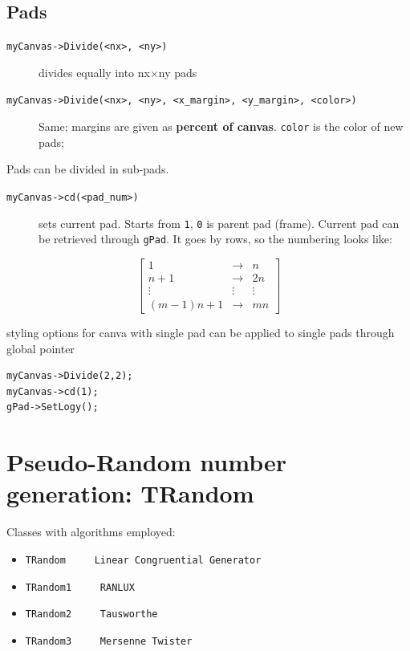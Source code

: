 \documentclass[10pt, twoside]{article}
\newcommand{\ttt}[1]{\colorbox{boxgray}{\texttt{#1}}}
\begin{document}
\subsection*{Pads}
\begin{description}
\item[\ttt{myCanvas->Divide(<nx>, <ny>)}] divides equally into nx$\times$ny pads 
\item[\ttt{myCanvas->Divide(<nx>, <ny>, <x\_margin>, <y\_margin>, <color>)}] Same; margins are given as \textbf{percent of canvas}. \ttt{color} is the color of new pads; 
\end{description}
Pads can be divided in sub-pads.
\begin{description}
\item[\ttt{myCanvas->cd(<pad\_num>)}] sets current pad. Starts from \ttt{1}, \ttt{0} is parent pad (frame). Current pad can be retrieved through \ttt{gPad}. It goes by rows, so the numbering looks like:
\end{description}
\[\begin{bmatrix}
1 & \rightarrow &  n \\
n+1 & \rightarrow & 2n \\
\vdots & \vdots & \vdots\\
(m-1)n + 1 & \rightarrow & mn
\end{bmatrix}\]

styling options for canva with single pad can be applied to single pads through global pointer
\begin{verbatim}
myCanvas->Divide(2,2);
myCanvas->cd(1);
gPad->SetLogy();
\end{verbatim}

\newpage
\section{Pseudo-Random number generation: TRandom}
Classes with algorithms employed:
\begin{itemize}
\item \texttt{TRandom \, \dotfill \, Linear Congruential Generator}
\begin{center}
\end{center}
\item \texttt{TRandom1 \, \dotfill \, RANLUX}
\item \texttt{TRandom2 \, \dotfill \, Tausworthe}
\item \texttt{TRandom3 \, \dotfill \, Mersenne Twister}
\end{itemize}
\end{document}
